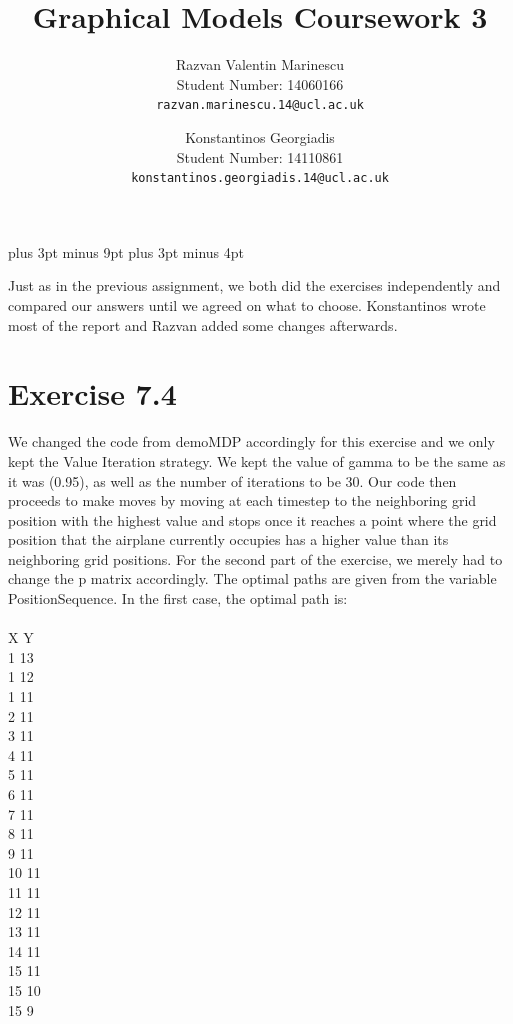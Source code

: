 \documentclass[11pt,a4paper,oneside]{report}
\title{Graphical Models Coursework 3}
\author{
Razvan Valentin Marinescu\\
Student Number: 14060166\\
\texttt{razvan.marinescu.14@ucl.ac.uk}
\and
Konstantinos Georgiadis\\
Student Number: 14110861\\
\texttt{konstantinos.georgiadis.14@ucl.ac.uk}
}
\begin{document}
\belowdisplayskip=12pt plus 3pt minus 9pt
\belowdisplayshortskip=7pt plus 3pt minus 4pt
\maketitle{}

Just as in the previous assignment, we both did the exercises independently and compared our answers until we agreed on what to choose. Konstantinos wrote most of the report and Razvan added some changes afterwards.

\section*{Exercise 7.4}

We changed the code from demoMDP accordingly for this exercise and we only kept the Value Iteration strategy. We kept the value of gamma to be the same as it was (0.95), as well as the number of iterations to be 30. Our code then proceeds to make moves by moving at each timestep to the neighboring grid position with the highest value and stops once it reaches a point where the grid position that the airplane currently occupies has a higher value than its neighboring grid positions. For the second part of the exercise, we merely had to change the p matrix accordingly. The optimal paths are given from the variable PositionSequence. In the first case, the optimal path is:\\\\
X Y\\
1     13\\
     1    12\\
     1    11\\
     2    11\\
     3    11\\
     4    11\\
     5    11\\
     6    11\\
     7    11\\
     8    11\\
     9    11\\
    10    11\\
    11    11\\
    12    11\\
    13    11\\
    14    11\\
    15    11\\
    15    10\\
    15     9\\
\end{document}

